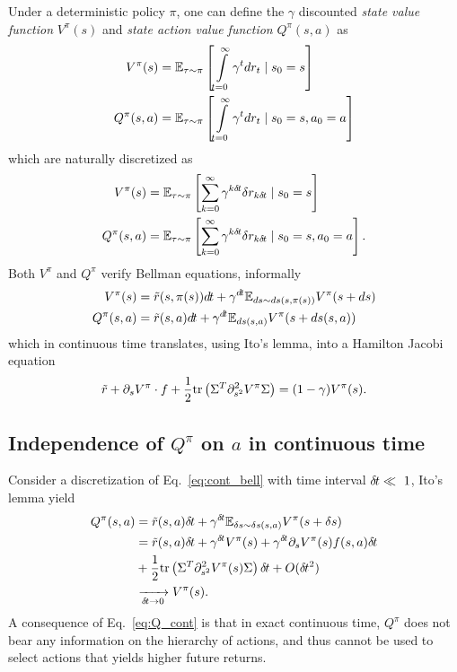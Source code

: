 \documentclass{article}
\begin{document}
Under a deterministic policy $\pi$, one can define the $\gamma$ discounted
\emph{state value function} $V^\pi(s)$ and \emph{state action value function}
$Q^\pi(s, a)$ as
\begin{align}
	V^\pi(s) &= \mathbb{E}_{\tau\sim\pi}\left[
		\int\limits_{t=0}^\infty \gamma^{t}
		dr_{t} \mid s_0 = s
	\right]\\
	Q^\pi(s, a) &= \mathbb{E}_{\tau\sim\pi}\left[
		\int\limits_{t=0}^\infty \gamma^{t}
		dr_{t} \mid s_0 = s, a_0 = a
	\right]
\end{align}
which are naturally discretized as
\begin{align}
	V^\pi(s) &= \mathbb{E}_{\tau\sim\pi}\left[
		\sum\limits_{k=0}^\infty \gamma^{k\delta\hspace{-.1em}t}
		\delta r_{k\delta\hspace{-.1em}t} \mid s_0 = s
	\right]\\
	Q^\pi(s, a) &= \mathbb{E}_{\tau\sim\pi}\left[
		\sum\limits_{k=0}^\infty \gamma^{k\delta\hspace{-.1em}t}
		\delta r_{k\delta\hspace{-.1em}t} \mid s_0 = s, a_0 = a
	\right].
\end{align}
Both $V^\pi$ and $Q^\pi$ verify Bellman equations, informally
\begin{align}
	V^\pi(s) &= \tilde{r}(s, \pi(s))d\hspace{-.1em}t + \gamma^{d\hspace{-.1em}t} \mathbb{E}_{ds \sim ds(s, \pi(s))} V^\pi(s + ds)\nonumber\\
	Q^\pi(s, a) &= \tilde{r}(s, a)d\hspace{-.1em}t + \gamma^{d\hspace{-.1em}t} \mathbb{E}_{ds(s, a)} V^\pi(s + ds(s, a))
	\label{eq:cont_bell}
\end{align}
which in continuous time translates, using Ito's lemma, into a Hamilton Jacobi equation
\begin{align}
	\tilde{r} + \partial_s V^\pi \cdot f + \frac{1}{2} \text{tr}\left(\Sigma^T\partial^2_{s^2} V^\pi\Sigma\right) = (1 - \gamma) V^\pi(s).
\end{align}

\subsection{Independence of $Q^\pi$ on $a$ in continuous time}
Consider a discretization of Eq.~\eqref{eq:cont_bell} with time interval
$\delta\hspace{-.1em}t \ll~1$, Ito's lemma yield
\begin{align}
	Q^\pi(s, a) &= \tilde{r}(s, a) \delta\hspace{-.1em}t + \gamma^{\delta\hspace{-.1em}t} \mathbb{E}_{\delta s \sim \delta s(s, a)}V^\pi(s + \delta s)\nonumber\\
		    &= \tilde{r}(s, a) \delta\hspace{-.1em}t + \gamma^{\delta\hspace{-.1em}t} V^\pi(s) +
		     \gamma^{\delta\hspace{-.1em}t} \partial_s V^\pi(s)f(s, a) \delta\hspace{-.1em}t\nonumber\\
		    &+ \frac{1}{2}\text{tr}\left(\Sigma^T\partial^2_{s^2}V^\pi(s)\Sigma\right)\delta\hspace{-.1em}t + O(\delta\hspace{-.1em}t^2)\nonumber\\
		    &\xrightarrow[\delta\hspace{-.1em}t \to 0]{} V^\pi(s).
		    \label{eq:Q_cont}
\end{align}
A consequence of Eq.~\eqref{eq:Q_cont} is that in exact continuous time,
$Q^\pi$ does not bear any information on the hierarchy of actions, and
thus cannot be used to select actions that yields higher future returns.
\end{document}
